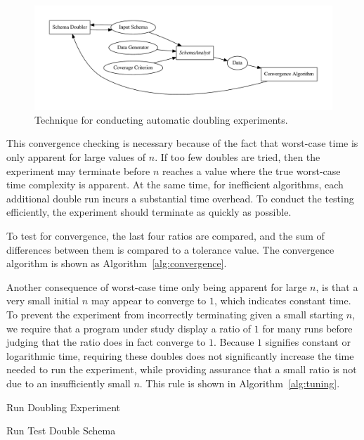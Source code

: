 \begin{figure}
\centering
  \centering
  \includegraphics[width=.5\linewidth]{../diagrams/doublingexp.pdf}
  \caption{Technique for conducting automatic doubling experiments.}
  \label{fig:doublingexp}
\end{figure}


This convergence checking is necessary because of the fact that worst-case
time is only apparent for large values of $n$. If too few doubles
are tried, then the experiment may terminate before $n$ reaches a value
where the true worst-case time complexity is apparent. At the same time,
for inefficient  algorithms, each additional double run incurs a substantial
time overhead. To conduct the testing efficiently, the experiment should
terminate as quickly as possible.

To test for convergence, the last four ratios are compared, and the
sum of differences between them is compared to a tolerance value. The
convergence algorithm is shown as Algorithm~\ref{alg:convergence}.
  
Another consequence of worst-case time only being apparent for large
$n$, is that a very small initial $n$ may appear to converge to $1$,
which indicates constant time. To prevent the
experiment from incorrectly terminating given a small starting $n$, we
require that a program under study display a ratio of $1$ for many
runs before judging that the ratio does in fact converge to $1$. Because 
$1$ signifies constant or logarithmic 
time, requiring these doubles does not significantly increase the time needed
to run the experiment, while providing assurance that a small ratio is not due
to an insufficiently small $n$. This rule is shown in 
Algorithm~\ref{alg:tuning}.

\begin{algorithm}[t]
    \caption{Run Doubling Experiment}
    \begin{algorithmic}
        \STATE Run Test
        \ENDFOR
        \STATE Double Schema
        \ENDWHILE
    \end{algorithmic}
    \label{alg:main}
  \end{algorithm}

